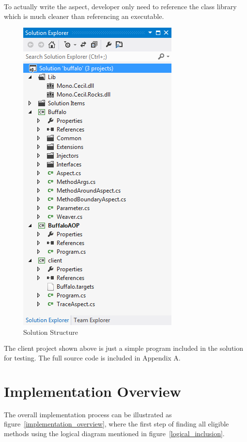 To actually write the aspect, developer only need to reference the class library which is much cleaner than referencing an executable.

\begin{figure}[H]
  \includegraphics[scale=1.0]{SolutionExplorer.PNG}
  \centering
  \caption{Solution Structure\label{solutionexplorer}}
\end{figure}

The client project shown above is just a simple program included in the solution for testing. The full source code is included in Appendix A.

\section{Implementation Overview}

The overall implementation process can be illustrated as figure~\ref{implementation_overview}, where the first step of finding all eligible methods using the logical diagram mentioned in figure~\ref{logical_inclusion}.

